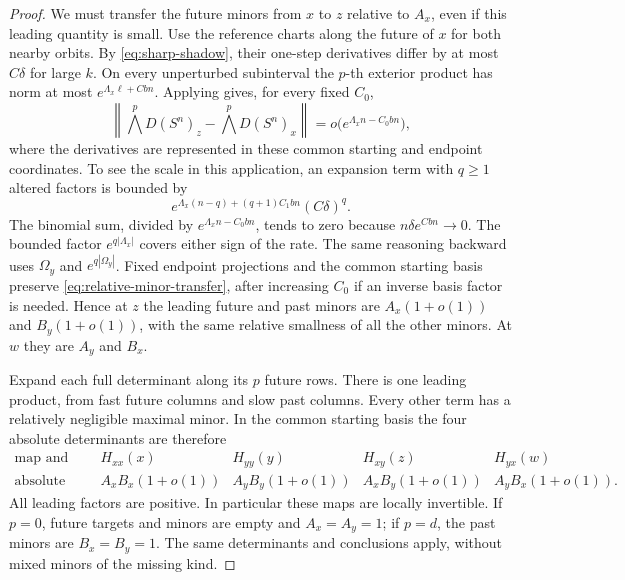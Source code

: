 \begin{proof}
We must transfer the future minors from $x$ to $z$ relative to $A_x$,
even if this leading quantity is small.  Use the reference charts
along the future of $x$ for both nearby orbits.  By
\eqref{eq:sharp-shadow}, their one-step derivatives differ by at most
$C\delta$ for large $k$.  On every unperturbed subinterval the
$p$-th exterior product has norm at most
$e^{\Lambda_x\ell+Cbn}$.
Applying  gives, for every fixed $C_0$,
\begin{equation}\label{eq:relative-minor-transfer}
 \left\|\bigwedge^pD(S^n)_z-
                   \bigwedge^pD(S^n)_x\right\|
       =o\bigl(e^{\Lambda_xn-C_0bn}\bigr),
\end{equation}
where the derivatives are represented in these common starting and
endpoint coordinates.  To see the scale in this application, an
expansion term with $q\ge1$ altered factors is bounded by
\[
 e^{\Lambda_x(n-q)+(q+1)C_1bn}(C\delta)^q.
\]
The binomial sum, divided by $e^{\Lambda_xn-C_0bn}$, tends to zero
because $n\delta e^{Cbn}\to0$.  The bounded factor
$e^{q|\Lambda_x|}$ covers either sign of the rate.  The same reasoning
backward uses $\Omega_y$ and $e^{q|\Omega_y|}$.
Fixed endpoint projections and the common starting basis preserve
\eqref{eq:relative-minor-transfer}, after increasing $C_0$ if an
inverse basis factor is needed.  Hence at $z$ the leading future and
past minors are $A_x(1+o(1))$ and $B_y(1+o(1))$, with the same relative
smallness of all the other minors.  At $w$ they are $A_y$ and $B_x$.

Expand each full determinant along its $p$ future rows.  There is one
leading product, from fast future columns and slow past columns.
Every other term has a relatively negligible maximal minor.  In the
common starting basis the four absolute determinants are therefore
\begin{equation}\label{eq:four-leading-products}
 \begin{array}{c|cccc}
 \text{map and point}&H_{xx}(x)&H_{yy}(y)&H_{xy}(z)&H_{yx}(w)\\ \hline
 \text{absolute determinant}&
 A_xB_x(1+o(1))&A_yB_y(1+o(1))&
 A_xB_y(1+o(1))&A_yB_x(1+o(1)).
 \end{array}
\end{equation}
All leading factors are positive.  In particular these maps are
locally invertible.  If $p=0$, future targets and minors are empty and
$A_x=A_y=1$; if $p=d$, the past minors are $B_x=B_y=1$.  The same
determinants and conclusions apply, without mixed minors of the
missing kind.


\end{proof}
